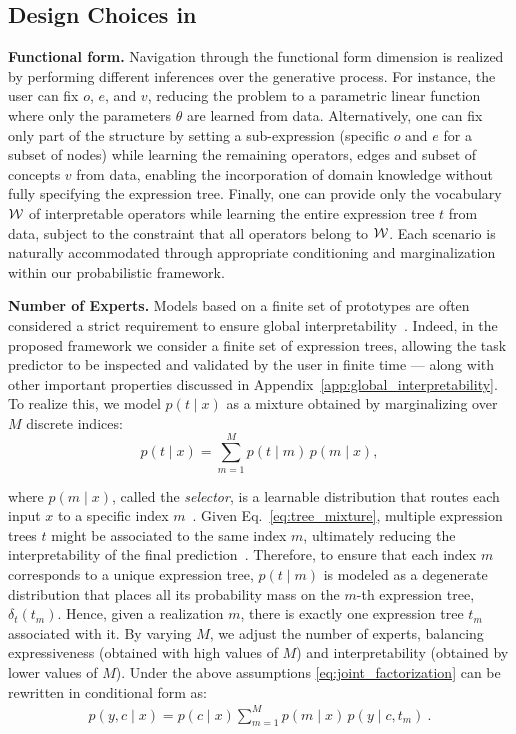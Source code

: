 \documentclass{article}
\theoremstyle{plain}
\theoremstyle{definition}
\theoremstyle{remark}
\newcommand{\mypar}[1]{\noindent\textbf{#1}}
\begin{document}
\subsection{Design Choices in \classacro}
\label{sec:design_plane}

\mypar{Functional form.} Navigation through the functional form dimension is realized by performing different inferences over the generative process. For instance, the user can fix $o$, $e$, and $v$, reducing the problem to a parametric linear function where only the parameters $\theta$ are learned from data. Alternatively, one can fix only part of the structure by setting a sub-expression (specific $o$ and $e$ for a subset of nodes) while learning the remaining operators, edges and subset of concepts $v$ from data, enabling the incorporation of domain knowledge without fully specifying the expression tree. Finally, one can provide only the vocabulary $\mathcal{W}$ of interpretable operators while learning the entire expression tree $t$ from data, subject to the constraint that all operators belong to $\mathcal{W}$. Each scenario is naturally accommodated through appropriate conditioning and marginalization within our probabilistic framework.

\mypar{Number of Experts.} Models based on a finite set of prototypes are often considered a strict requirement to ensure global interpretability~\cite{rudin2019stop,rudin2022interpretable}. Indeed, in the proposed framework we consider a finite set of expression trees, allowing the task predictor to be inspected and validated by the user in finite time — along with other important properties discussed in Appendix~\ref{app:global_interpretability}. To realize this, we model $p(t\mid x)$ as a mixture obtained by marginalizing over $M$ discrete indices:
\begin{equation}
    p(t \mid x) = \sum_{m=1}^{M} p(t\mid m)\, p(m\mid x),
    \label{eq:tree_mixture}
\end{equation}

where $p(m\mid x)$, called the \emph{selector},  is a learnable distribution that routes each input $x$ to a specific index $m$~\citep{debot2024interpretable}. Given Eq.~\ref{eq:tree_mixture}, multiple expression trees $t$ might be associated to the same index $m$, ultimately reducing the interpretability of the final prediction~\citep{breiman2001random,meinshausen2010node}. Therefore, to ensure that each index $m$ corresponds to a unique expression tree, $p(t \mid m)$ is modeled as a degenerate distribution that places all its probability mass on the $m$-th expression tree, $\delta_t(t_m)$. Hence, given a realization $m$, there is exactly one expression tree $t_m$ associated with it.
By varying $M$, we adjust the number of experts, balancing  expressiveness (obtained with high values of $M$) and interpretability (obtained by lower values of $M$).
Under the above assumptions \cref{eq:joint_factorization} can be rewritten in conditional form as:
\begin{align}
    p(y,c\mid x) = p(c\mid x) \sum_{m=1}^M p(m\mid x)\, p(y\mid c,t_m) \ .
    \label{eq:memory_factorization}
\end{align}
\end{document}
